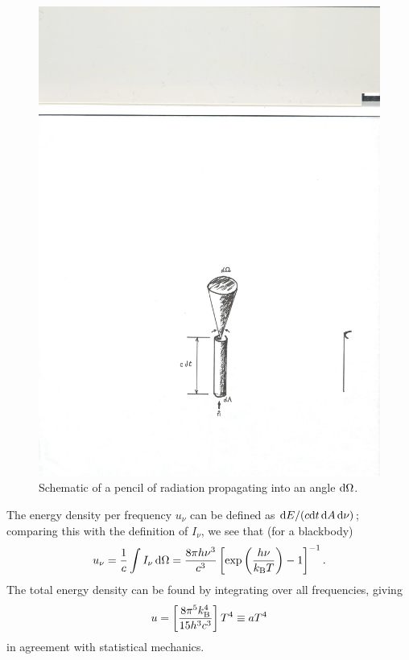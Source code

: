 \begin{figure}[htbp]
\centering\includegraphics{intensity-schematic}
\caption{\label{f.intensity-schematic}Schematic of a pencil of radiation propagating into an angle $\mathrm{d}\Omega$.}
\end{figure}

The energy density per frequency $u_{\nu}$ can be defined as $\mathrm{d} E/(c \mathrm{d} t\,\mathrm{d} A\,\mathrm{d}\nu)$; comparing this with the definition of $I_{\nu}$, we see that (for a blackbody)
\begin{equation}\label{e.radiation-energy-density}
u_{\nu} = \frac{1}{c}\int I_{\nu}\,\mathrm{d}\Omega = \frac{8\pi h\nu^{3}}{c^{3}}\left[\exp\left(\frac{h\nu}{k_\mathrm{B} T}\right)-1\right]^{-1}.
\end{equation}
The total energy density can be found by integrating over all frequencies, giving
\[ u = \left[\frac{8\pi^{5}k_\mathrm{B}^{4}}{15 h^{3}c^{3}}\right] T^{4}\equiv aT^{4} \]
in agreement with statistical mechanics.


